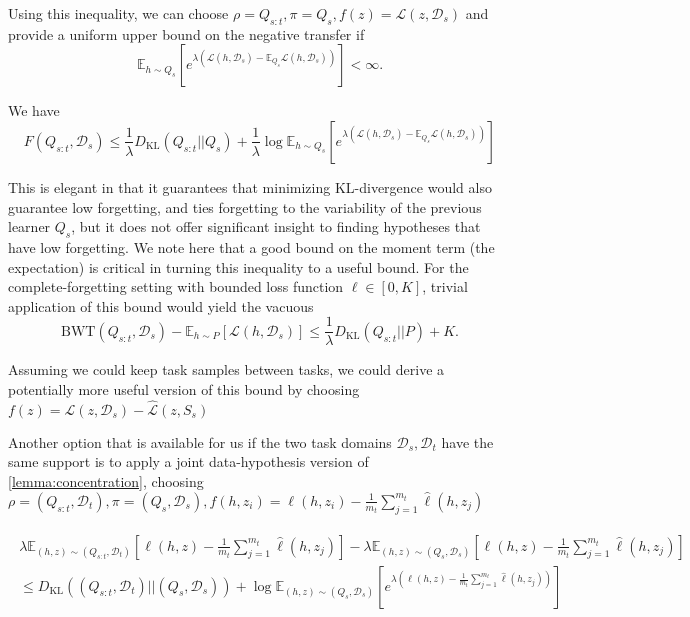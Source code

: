 \documentclass[letterpaper]{article}
\theoremstyle{definition}
\begin{document}
Using this inequality, we can choose $\rho=Q_{s:t}, \pi=Q_s, f(z)=\mathcal{L}(z,\mathcal{D}_s)$ and provide a uniform upper bound on the negative transfer if $$\mathbb{E}_{h\sim Q_s}\left [e^{\lambda(\mathcal{L}(h,\mathcal{D}_s)-\mathbb{E}_{Q_s} \mathcal{L}(h,\mathcal{D}_s))} \right ]<\infty.$$

We have 
\begin{equation}
F(Q_{s:t},\mathcal{D}_s)\leq \frac{1}{\lambda}D_{\mathrm{KL}}(Q_{s:t}||Q_s)+\frac{1}{\lambda}\log\mathbb{E}_{h\sim Q_s}\left [e^{\lambda(\mathcal{L}(h,\mathcal{D}_s)-\mathbb{E}_{Q_s} \mathcal{L}(h,\mathcal{D}_s))} \right ]
\end{equation}

This is elegant in that it guarantees that minimizing KL-divergence would also guarantee low forgetting, and ties forgetting to the variability of the previous learner $Q_s$, but it does not offer significant insight to finding hypotheses that have low forgetting. We note here that a good bound on the moment term (the expectation) is critical in turning this inequality to a useful bound. For the complete-forgetting setting with bounded loss function $\ell\in [0,K]$, trivial application of this bound would yield the vacuous $$\mathrm{BWT}(Q_{s:t},\mathcal{D}_s)-\mathbb{E}_{h\sim P}\left [\mathcal{L}(h,\mathcal{D}_s)\right ]\leq  \frac{1}{\lambda}D_{\mathrm{KL}}(Q_{s:t}||P)+K.$$

Assuming we could keep task samples between tasks, we could derive a potentially more useful version of this bound by choosing $f(z)=\mathcal{L}(z,\mathcal{D}_s)-\hat{\mathcal{L}}(z,S_s)$ %

Another option that is available for us if the two task domains $\mathcal{D}_s, \mathcal{D}_t$ have the same support is to apply a joint data-hypothesis version of \ref{lemma:concentration},
choosing $\rho=(Q_{s:t},\mathcal{D}_t), \pi=(Q_s, \mathcal{D}_s), f(h,z_i)=\ell(h,z_i)-\frac{1}{m_t}\sum_{j=1}^{m_t}\hat{\ell}(h,z_j)$

\begin{align*}
\begin{split}
\lambda\mathbb{E}_{(h,z)\sim (Q_{s:t},\mathcal{D}_t)}\left [\ell(h,z)-\frac{1}{m_t}\sum_{j=1}^{m_t}\hat{\ell}(h,z_j) \right ] - \lambda\mathbb{E}_{(h,z)\sim (Q_{s},\mathcal{D}_s)}\left [\ell(h,z)-\frac{1}{m_t}\sum_{j=1}^{m_t}\hat{\ell}(h,z_j) \right ] \\
\leq D_{\mathrm{KL}}((Q_{s:t},\mathcal{D}_t)||(Q_{s},\mathcal{D}_s))+\log\mathbb{E}_{(h,z)\sim (Q_{s},\mathcal{D}_s)}\left [e^{\lambda(\ell(h,z)-\frac{1}{m_t}\sum_{j=1}^{m_t}\hat{\ell}(h,z_j))} \right ]
\end{split}
\end{align*}
\end{document}
